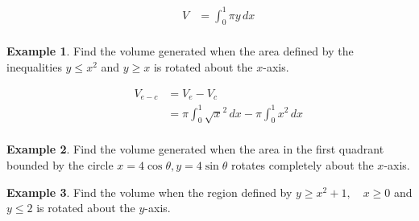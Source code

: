 \documentclass[12pt, a4paper]{report}
\theoremstyle{definition}
\newtheorem{example}{Example}
\begin{document}
	\begin{alignat*}{2}
		&   & V & =\int_{0}^{1} \pi y \, dx \\
	\end{alignat*}
	
	\begin{example}
		Find the volume generated when the area defined by the inequalities $y\leq x^2$ and $y\geq x$ is rotated about the $x$-axis.
	\end{example}
	\begin{multicols}{2}
		\begin{center}
			
		\end{center}
		
	\end{multicols}
	\begin{alignat*}{2}
		&   & V_{e-c} & = V_e - V_c                                                      \\
		&   &         & = \pi \int_{0}^{1} \sqrt{x}^2 \, dx - \pi \int_{0}^{1} x^2 \, dx \\
	\end{alignat*}
	\begin{example}
		Find the volume generated when the area in the first quadrant bounded by the circle $x=4\cos\theta, y=4\sin\theta$ rotates completely about the $x$-axis.
	\end{example}
	\begin{example}
		
		Find the volume when the region defined by  $y\geq x^2+1,\quad x\geq0$ and $y\leq2$ is rotated about the $y$-axis.
	\end{example}
\end{document}
